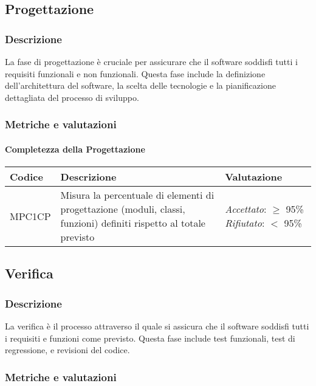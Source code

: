 \subsection{Progettazione}
\subsubsection{Descrizione}
La fase di progettazione è cruciale per assicurare che il software soddisfi tutti i requisiti funzionali e non funzionali. Questa fase include la definizione dell'architettura del software, la scelta delle tecnologie e la pianificazione dettagliata del processo di sviluppo.

\subsubsection{Metriche e valutazioni}
\paragraph{Completezza della Progettazione}

\begin{table}[h]
\centering
\begin{tabular}{ |>{\centering\arraybackslash}m{3cm}|>{\centering\arraybackslash}m{10cm}|>{\centering\arraybackslash}m{3cm}| }
\hline
Codice & Descrizione & Valutazione\\
\hline
MPC1CP & Misura la percentuale di elementi di progettazione (moduli, classi, funzioni) definiti rispetto al totale previsto &
\textit{Accettato}: $\geq$ 95\%
\textit{Rifiutato}: $<$ 95\% \\
\hline
\end{tabular}
\end{table}

\subsection{Verifica}
\subsubsection{Descrizione}
La verifica è il processo attraverso il quale si assicura che il software soddisfi tutti i requisiti e funzioni come previsto. Questa fase include test funzionali, test di regressione, e revisioni del codice.

\subsubsection{Metriche e valutazioni}
